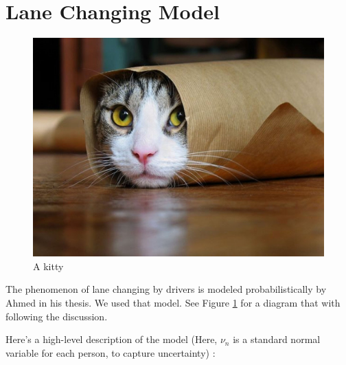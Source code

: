\section{Lane Changing Model}

\begin{figure}
  \includegraphics[width=\linewidth]{kitty.jpg}
  \caption{A kitty}
  \label{fig:kitty1}
\end{figure}

The phenomenon of lane changing by drivers is modeled probabilistically by Ahmed in his thesis. We used that model. See Figure \ref{fig:kitty1} for a diagram that with following the discussion.



Here’s a high-level description of the model (Here, $\nu_n$ is a standard normal variable for each person, to capture uncertainty) :

